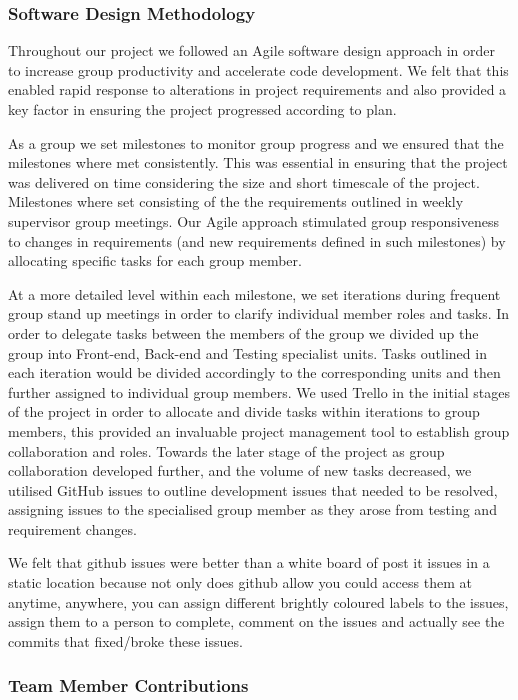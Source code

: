   \subsubsection{Software Design Methodology}
    Throughout our project we followed an Agile software design approach in order to increase group productivity and accelerate code development. We felt that this enabled rapid response to alterations in project requirements and also provided a key factor in ensuring the project progressed according to plan.

    As a group we set milestones to monitor group progress and we ensured that the milestones where met consistently. This was essential in ensuring that the project was delivered on time considering the size and short timescale of the project. Milestones where set consisting of the the requirements outlined in weekly supervisor group meetings. Our Agile approach stimulated group responsiveness to changes in requirements (and new requirements defined in such milestones) by allocating specific tasks for each group member. 

    At a more detailed level within each milestone, we set iterations during frequent group stand up meetings in order to clarify individual member roles and tasks. In order to delegate tasks between the members of the group we divided up the group into Front-end, Back-end and Testing specialist units. Tasks outlined in each iteration would be divided accordingly to the corresponding units and then further assigned to individual group members. We used Trello in the initial stages of the project in order to allocate and divide tasks within iterations to group members, this provided an invaluable project management tool to establish group collaboration and roles. Towards the later stage of the project as group collaboration developed further, and the volume of new tasks decreased, we utilised GitHub issues to outline development issues that needed to be resolved, assigning issues to the specialised group member as they arose from testing and requirement changes.

    We felt that github issues were better than a white board of post it issues in a static location because not only does github allow you could access them at anytime, anywhere, you can assign different brightly coloured labels to the issues, assign them to a person to complete, comment on the issues and actually see the commits that fixed/broke these issues.

  \subsubsection {Team Member Contributions}
